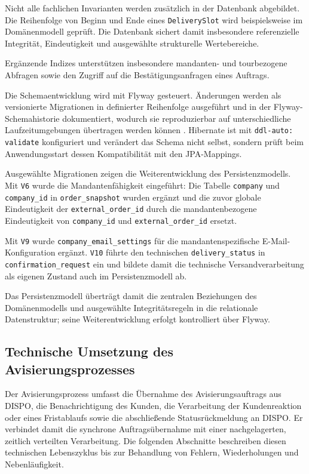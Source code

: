 Nicht alle fachlichen Invarianten werden zusätzlich in der Datenbank
abgebildet. Die Reihenfolge von Beginn und Ende eines \texttt{DeliverySlot}
wird beispielsweise im Domänenmodell geprüft. Die Datenbank sichert damit
insbesondere referenzielle Integrität, Eindeutigkeit und ausgewählte
strukturelle Wertebereiche.

Ergänzende Indizes unterstützen insbesondere mandanten- und tourbezogene
Abfragen sowie den Zugriff auf die Bestätigungsanfragen eines Auftrags.

Die Schemaentwicklung wird mit Flyway gesteuert. Änderungen werden als
versionierte Migrationen in definierter Reihenfolge ausgeführt und in der
Flyway-Schemahistorie dokumentiert, wodurch sie reproduzierbar auf
unterschiedliche Laufzeitumgebungen übertragen werden können
\parencite{redgate2024versionedMigrations}. Hibernate ist mit
\texttt{ddl-auto: validate} konfiguriert und verändert das Schema nicht selbst,
sondern prüft beim Anwendungsstart dessen Kompatibilität mit den JPA-Mappings.

Ausgewählte Migrationen zeigen die Weiterentwicklung des Persistenzmodells.
Mit \texttt{V6} wurde die Mandantenfähigkeit eingeführt: Die Tabelle
\texttt{company} und \texttt{company\_id} in \texttt{order\_snapshot} wurden
ergänzt und die zuvor globale Eindeutigkeit der
\texttt{external\_order\_id} durch die mandantenbezogene Eindeutigkeit von
\texttt{company\_id} und \texttt{external\_order\_id} ersetzt.

Mit \texttt{V9} wurde \texttt{company\_email\_settings} für die
mandantenspezifische E-Mail-Konfiguration ergänzt. \texttt{V10} führte den
technischen \texttt{delivery\_status} in
\texttt{confirmation\_request} ein und bildete damit die technische
Versandverarbeitung als eigenen Zustand auch im Persistenzmodell ab.

Das Persistenzmodell überträgt damit die zentralen Beziehungen des
Domänenmodells und ausgewählte Integritätsregeln in die relationale
Datenstruktur; seine Weiterentwicklung erfolgt kontrolliert über Flyway.

\subsection{Technische Umsetzung des Avisierungsprozesses}
\label{sec:prozessumsetzung}

Der Avisierungsprozess umfasst die Übernahme des Avisierungsauftrags aus DISPO,
die Benachrichtigung des Kunden, die Verarbeitung der Kundenreaktion oder eines
Fristablaufs sowie die abschließende Statusrückmeldung an DISPO. Er verbindet
damit die synchrone Auftragsübernahme mit einer nachgelagerten, zeitlich
verteilten Verarbeitung. Die folgenden Abschnitte beschreiben diesen
technischen Lebenszyklus bis zur Behandlung von Fehlern, Wiederholungen und
Nebenläufigkeit.

